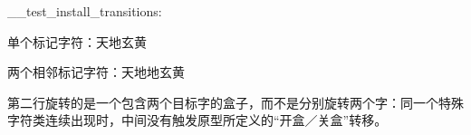\documentclass{article}
\begin{document}
\ExplSyntaxOn\__test_install_transitions:\ExplSyntaxOff

\noindent 单个标记字符：\quad 天地玄黄

\bigskip
\noindent 两个相邻标记字符：\quad 天地地玄黄

\bigskip
第二行旋转的是一个包含两个目标字的盒子，而不是分别旋转两个字：同一个特殊
字符类连续出现时，中间没有触发原型所定义的“开盒／关盒”转移。
\end{document}
